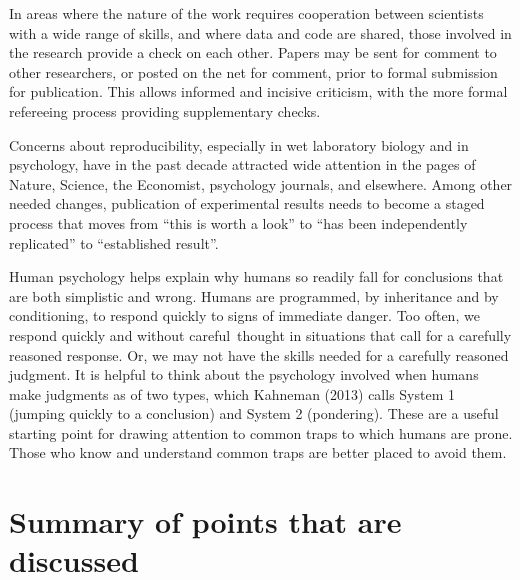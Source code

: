 \documentclass[
  10pt,
  b5paper]{book}
\begin{document}
In areas where the nature of the work requires cooperation between
scientists with a wide range of skills, and where data and code
are shared, those involved in the research provide a check on each
other. Papers may be sent for comment to other researchers, or
posted on the net for comment, prior to formal submission for
publication. This allows informed and incisive criticism, with
the more formal refereeing process providing supplementary checks.

Concerns about reproducibility, especially in wet laboratory
biology and in psychology, have in the past decade attracted
wide attention in the pages of Nature, Science, the Economist,
psychology journals, and elsewhere. Among other needed changes,
publication of experimental results needs to become a staged
process that moves from ``this is worth a look'' to ``has been
independently replicated'' to ``established result''.

Human psychology helps explain why humans so readily fall for
conclusions that are both simplistic and wrong. Humans are
programmed, by inheritance and by conditioning, to respond
quickly to signs of immediate danger. Too often, we respond
quickly and without careful~thought in situations that call
for a carefully reasoned response. Or, we may not have the
skills needed for a carefully reasoned judgment.
It is helpful to think about the psychology involved when humans
make judgments as of two types, which Kahneman (2013) calls System 1
(jumping quickly to a conclusion) and System 2 (pondering).
These are a useful starting point for drawing attention to common
traps to which humans are prone. Those who know and understand
common traps are better placed to avoid them.

\hypertarget{summary-of-points-that-are-discussed}{%
\chapter*{Summary of points that are discussed}\label{summary-of-points-that-are-discussed}}
\end{document}
